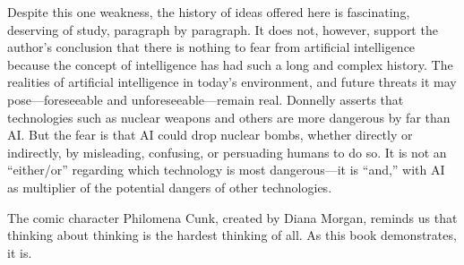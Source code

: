 \documentclass{tufte-handout}
\begin{document}
Despite this one weakness, the history of ideas offered here is
fascinating, deserving of study, paragraph by paragraph. It does not,
however, support the author's conclusion that there is nothing to fear
from artificial intelligence because the concept of intelligence has had
such a long and complex history. The realities of artificial
intelligence in today's environment, and future threats it may
pose---foreseeable and unforeseeable---remain real. Donnelly asserts
that technologies such as nuclear weapons and others are more dangerous
by far than AI. But the fear is that AI could drop nuclear bombs,
whether directly or indirectly, by misleading, confusing, or persuading
humans to do so. It is not an ``either/or'' regarding which technology
is most dangerous---it is ``and,'' with AI as multiplier of the
potential dangers of other technologies.

The comic character Philomena Cunk, created by Diana Morgan, reminds us
that thinking about thinking is the hardest thinking of all. As this
book demonstrates, it is.
\end{document}
